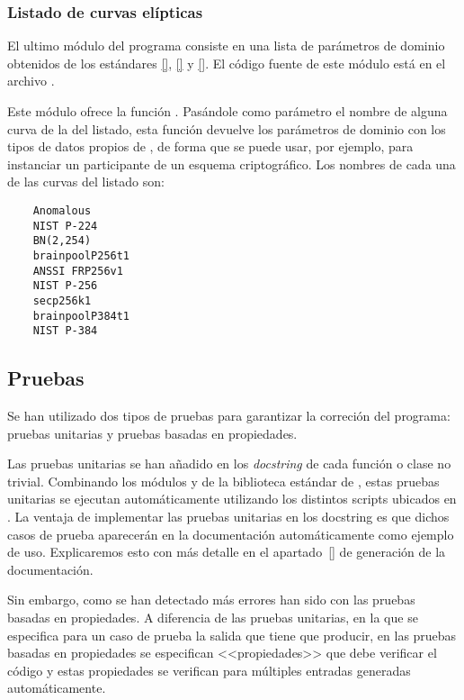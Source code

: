 \subsubsection{Listado de curvas elípticas}
\label{subs:Listado de curvas elípticas}

El ultimo módulo del programa consiste en una lista de parámetros de dominio obtenidos de los estándares \ref{}, \ref{} y \ref{}. El código fuente de este módulo está en el archivo .

Este módulo ofrece la función . Pasándole como parámetro el nombre de alguna curva de la del listado, esta función devuelve los parámetros de dominio con los tipos de datos propios de , de forma que se puede usar, por ejemplo, para instanciar un participante de un esquema criptográfico. Los nombres de cada una de las curvas del listado son:
\begin{verbatim}
    Anomalous
    NIST P-224
    BN(2,254)
    brainpoolP256t1
    ANSSI FRP256v1
    NIST P-256
    secp256k1
    brainpoolP384t1
    NIST P-384
\end{verbatim}

\subsection{Pruebas}
\label{sub:Pruebas}

Se han utilizado dos tipos de pruebas para garantizar la correción del programa: pruebas unitarias y pruebas basadas en propiedades.

Las pruebas unitarias se han añadido en los \emph{docstring} de cada función o clase no trivial. Combinando los módulos  y  de la biblioteca estándar de , estas pruebas unitarias se ejecutan automáticamente utilizando los distintos scripts ubicados en . La ventaja de implementar las pruebas unitarias en los docstring es que dichos casos de prueba aparecerán en la documentación automáticamente como ejemplo de uso. Explicaremos esto con más detalle en el apartado~\ref{} de generación de la documentación.

Sin embargo, como se han detectado más errores han sido con las pruebas basadas en propiedades. A diferencia de las pruebas unitarias, en la que se especifica para un caso de prueba la salida que tiene que producir, en las pruebas basadas en propiedades se especifican <<propiedades>> que debe verificar el código y estas propiedades se verifican para múltiples entradas generadas automáticamente.

